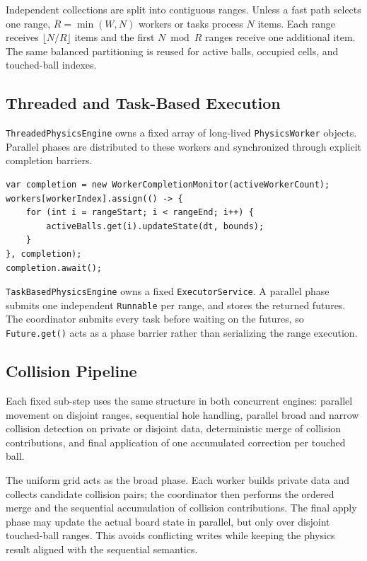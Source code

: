 Independent collections are split into contiguous ranges. Unless a fast path
selects one range, $R=\min(W,N)$ workers or tasks process $N$ items. Each range
receives $\lfloor N/R \rfloor$ items and the first $N \bmod R$ ranges receive
one additional item. The same balanced partitioning is reused for active
balls, occupied cells, and touched-ball indexes.

\subsection{Threaded and Task-Based Execution}

\texttt{ThreadedPhysicsEngine} owns a fixed array of long-lived
\texttt{PhysicsWorker} objects. Parallel phases are distributed to these
workers and synchronized through explicit completion barriers.

\begin{lstlisting}[style=codestyle,caption={Platform-thread dispatch and barrier, adapted from \texttt{model.physics.threaded.ThreadedPhysicsEngine}},label={lst:threaded-dispatch}]
var completion = new WorkerCompletionMonitor(activeWorkerCount);
workers[workerIndex].assign(() -> {
    for (int i = rangeStart; i < rangeEnd; i++) {
        activeBalls.get(i).updateState(dt, bounds);
    }
}, completion);
completion.await();
\end{lstlisting}

\texttt{TaskBasedPhysicsEngine} owns a fixed \texttt{ExecutorService}. A
parallel phase submits one independent \texttt{Runnable} per range, and
stores the returned futures. The coordinator submits every task before waiting
on the futures, so \texttt{Future.get()} acts as a phase barrier rather than
serializing the range execution.

\subsection{Collision Pipeline}

Each fixed sub-step uses the same structure in both concurrent engines:
parallel movement on disjoint ranges, sequential hole handling, parallel broad
and narrow collision detection on private or disjoint data, deterministic merge
of collision contributions, and final application of one accumulated correction
per touched ball.

The uniform grid acts as the broad phase. Each worker builds private data and
collects candidate collision pairs; the coordinator then performs the ordered
merge and the sequential accumulation of collision contributions. The final
apply phase may update the actual board state in parallel, but only over
disjoint touched-ball ranges. This avoids conflicting writes while keeping the
physics result aligned with the sequential semantics.

